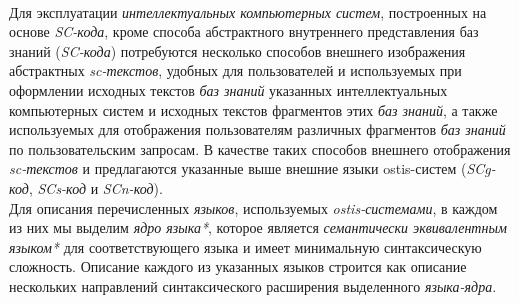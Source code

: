 \begin{SCn}
\begin{scnstruct}
{        \\Для эксплуатации \textit{интеллектуальных компьютерных систем}, построенных на основе \textit{SC-кода}, кроме способа абстрактного внутреннего представления баз знаний (\textit{SC-кода}) потребуются несколько способов внешнего изображения абстрактных \textit{sc-текстов}, удобных для пользователей и используемых при оформлении исходных текстов \textit{баз знаний} указанных интеллектуальных компьютерных систем и исходных текстов фрагментов этих \textit{баз знаний}, а также используемых для отображения пользователям различных фрагментов \textit{баз знаний} по пользовательским запросам. В качестве таких способов внешнего отображения \textit{sc-текстов} и предлагаются указанные выше внешние языки ostis-систем (\textit{SCg-код}, \textit{SCs-код} и  \textit{SCn-код}). 
        \\Для описания перечисленных \textit{языков}, используемых \textit{ostis-системами}, в каждом из них мы выделим \textit{ядро языка*}, которое является \textit{семантически эквивалентным языком*} для соответствующего языка и имеет минимальную синтаксическую сложность. Описание каждого из указанных языков строится как описание нескольких направлений синтаксического расширения выделенного \textit{языка-ядра}.}
        

\end{scnstruct}
\end{SCn}
